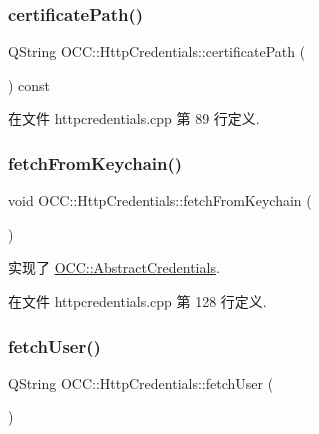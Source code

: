 \subsubsection{\texorpdfstring{certificate\+Path()}{certificatePath()}}
{\footnotesize\ttfamily Q\+String O\+C\+C\+::\+Http\+Credentials\+::certificate\+Path (\begin{DoxyParamCaption}{ }\end{DoxyParamCaption}) const}



在文件 httpcredentials.\+cpp 第 89 行定义.

\mbox{\label{class_o_c_c_1_1_http_credentials_a2408a2a5b97336cc09219323e98bca65}} 
\subsubsection{\texorpdfstring{fetch\+From\+Keychain()}{fetchFromKeychain()}}
{\footnotesize\ttfamily void O\+C\+C\+::\+Http\+Credentials\+::fetch\+From\+Keychain (\begin{DoxyParamCaption}{ }\end{DoxyParamCaption})\hspace{0.3cm}{\ttfamily [virtual]}}



实现了 \hyperlink{class_o_c_c_1_1_abstract_credentials_aac58b02f74811eeedb0fd944bf8a20c3}{O\+C\+C\+::\+Abstract\+Credentials}.



在文件 httpcredentials.\+cpp 第 128 行定义.

\mbox{\label{class_o_c_c_1_1_http_credentials_ad7c0471a9595f80a03558bbbbfb2e278}} 
\subsubsection{\texorpdfstring{fetch\+User()}{fetchUser()}}
{\footnotesize\ttfamily Q\+String O\+C\+C\+::\+Http\+Credentials\+::fetch\+User (\begin{DoxyParamCaption}{ }\end{DoxyParamCaption})}



